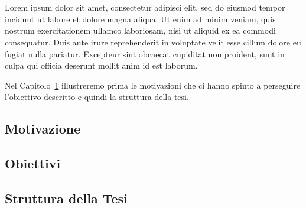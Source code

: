 \chapter{}
\label{chap:1-introduction}

Lorem ipsum dolor sit amet, consectetur adipisci elit, sed do eiusmod tempor incidunt ut labore et dolore magna aliqua. Ut enim ad minim veniam, quis nostrum exercitationem ullamco laboriosam, nisi ut aliquid ex ea commodi consequatur. Duis aute irure reprehenderit in voluptate velit esse cillum dolore eu fugiat nulla pariatur. Excepteur sint obcaecat cupiditat non proident, sunt in culpa qui officia deserunt mollit anim id est laborum.

Nel Capitolo~\ref{chap:1-introduction} illustreremo prima le motivazioni che ci hanno spinto a perseguire l'obiettivo descritto e quindi la struttura della tesi.

\section{Motivazione}
\section{Obiettivi}
\section{Struttura della Tesi}
